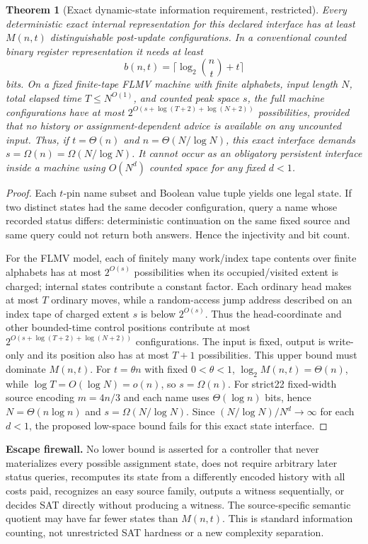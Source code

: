 \documentclass[11pt]{article}
\newtheorem{theorem}{Theorem}
\begin{document}
\begin{theorem}[Exact dynamic-state information requirement, restricted]
Every deterministic exact internal representation for this declared interface has at least $M(n,t)$ distinguishable post-update configurations. In a conventional counted binary register representation it needs at least
\[
b(n,t)=\Big\lceil\log_2\binom nt+t\Big\rceil
\]
bits. On a fixed finite-tape FLMV machine with finite alphabets, input length $N$, total elapsed time $T\le N^{O(1)}$, and counted peak space $s$, the full machine configurations have at most $2^{O(s+\log(T+2)+\log(N+2))}$ possibilities, provided that no history or assignment-dependent advice is available on any uncounted input. Thus, if $t=\Theta(n)$ and $n=\Theta(N/\log N)$, this exact interface demands $s=\Omega(n)=\Omega(N/\log N)$. It cannot occur as an obligatory persistent interface inside a machine using $O(N^d)$ counted space for any fixed $d<1$.
\end{theorem}
\begin{proof}
Each $t$-pin name subset and Boolean value tuple yields one legal state. If two distinct states had the same decoder configuration, query a name whose recorded status differs: deterministic continuation on the same fixed source and same query could not return both answers. Hence the injectivity and bit count.

For the FLMV model, each of finitely many work/index tape contents over finite alphabets has at most $2^{O(s)}$ possibilities when its occupied/visited extent is charged; internal states contribute a constant factor. Each ordinary head makes at most $T$ ordinary moves, while a random-access jump address described on an index tape of charged extent $s$ is below $2^{O(s)}$. Thus the head-coordinate and other bounded-time control positions contribute at most $2^{O(s+\log(T+2)+\log(N+2))}$ configurations. The input is fixed, output is write-only and its position also has at most $T+1$ possibilities. This upper bound must dominate $M(n,t)$. For $t=\theta n$ with fixed $0<\theta<1$, $\log_2M(n,t)=\Theta(n)$, while $\log T=O(\log N)=o(n)$, so $s=\Omega(n)$. For strict22 fixed-width source encoding $m=4n/3$ and each name uses $\Theta(\log n)$ bits, hence $N=\Theta(n\log n)$ and $s=\Omega(N/\log N)$. Since $(N/\log N)/N^d\to\infty$ for each $d<1$, the proposed low-space bound fails for this exact state interface.
\end{proof}
\noindent\textbf{Escape firewall.} No lower bound is asserted for a controller that never materializes every possible assignment state, does not require arbitrary later status queries, recomputes its state from a differently encoded history with all costs paid, recognizes an easy source family, outputs a witness sequentially, or decides SAT directly without producing a witness. The source-specific semantic quotient may have far fewer states than $M(n,t)$. This is standard information counting, not unrestricted SAT hardness or a new complexity separation.
\end{document}
